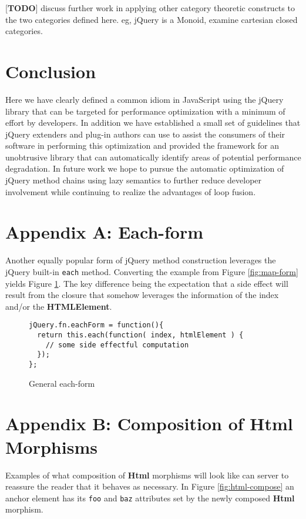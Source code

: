 \documentclass[preprint]{sigplanconf}
\begin{document}
[\textbf{TODO}] discuss further work in applying other category theoretic constructs to the two categories defined here. eg, jQuery is a Monoid, examine cartesian closed categories.

\section{Conclusion}

Here we have clearly defined a common idiom in JavaScript using the jQuery library that can be targeted for performance optimization with a minimum of effort by developers. In addition we have established a small set of guidelines that jQuery extenders and plug-in authors can use to assist the consumers of their software in performing this optimization and provided the framework for an unobtrusive library that can automatically identify areas of potential performance degradation. In future work we hope to pursue the automatic optimization of jQuery method chains using lazy semantics to further reduce developer involvement while continuing to realize the advantages of loop fusion.

\appendix
\section{Appendix A: Each-form}

Another equally popular form of jQuery method construction leverages the jQuery built-in \verb|each| method. Converting the example from Figure \ref{fig:map-form} yields Figure \ref{fig:each-form}. The key difference being the expectation that a side effect will result from the closure that somehow leverages the information of the index and/or the \textbf{HTMLElement}.

\begin{figure}[!ht]
\small
\begin{verbatim}
jQuery.fn.eachForm = function(){
  return this.each(function( index, htmlElement ) {
    // some side effectful computation
  });
};
\end{verbatim}
\nocaptionrule \caption{General each-form}
\label{fig:each-form}
\end{figure}

\section{Appendix B: Composition of Html Morphisms}

Examples of what composition of \textbf{Html} morphisms will look like can server to reassure the reader that it behaves as necessary. In Figure \ref{fig:html-compose} an anchor element has its \verb|foo| and \verb|baz| attributes set by the newly composed \textbf{Html} morphism.
\end{document}
